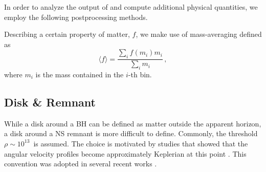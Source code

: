 In order to analyze the output of \wisky{} and compute 
additional physical quantities, we employ the following 
postprocessing methods. 



Describing a certain property of matter, $f$, we make use of 
mass-averaging defined as 
%
\begin{equation}
\label{eq:ppr:average}
\langle f \rangle = \frac{\sum_i f(m_i)m_i}{\sum_i m_i}\, ,
\end{equation}
%
where $m_i$ is the mass contained in the $i$-th bin.



\subsection{Disk \& Remnant}\label{sec:bns_sims:method:disk}



While a disk around a \ac{BH} can be defined as matter outside the apparent 
horizon, a disk around a \ac{NS} remnant is more difficult to define. Commonly, the 
threshold $\rho\sim 10^{13}\,$\gcm{} is assumed. The choice is motivated by studies that 
showed that the angular velocity profiles become approximately Keplerian at this point 
\citep[\eg][]{Shibata:2005ss,Shibata:2006nm,Hanauske:2016gia,Kastaun:2016elu}.
This convention was adopted in several recent works 
\citep{Radice:2018pdn,Kiuchi:2019lls,Vincent:2019kor}.
%
%
%

